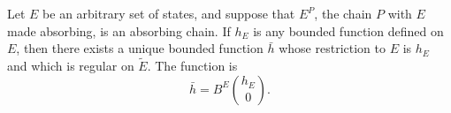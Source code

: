 Let $E$ be an arbitrary set of states, and suppose that $E^P$, the chain $P$ with $E$ made absorbing, is an absorbing chain. If $h_E$ is any bounded function defined on $E$, then there exists a unique bounded function $\bar{h}$ whose restriction to $E$ is $h_E$ and which is regular on $\tilde{E}$. The function is
$$\bar{h} = B^E \binom{h_E}{0}.$$
